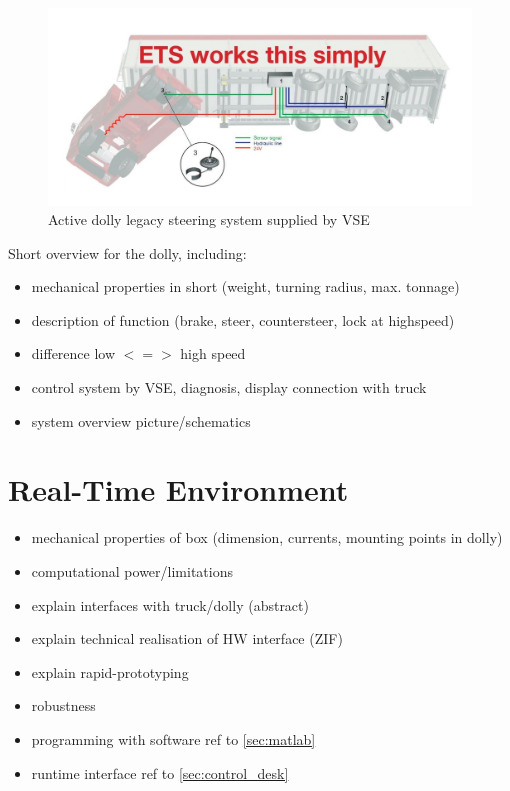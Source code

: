 \documentclass[ExampleMasters.tex]{subfiles}
\begin{document}
\begin{figure}[h]
\centering
\includegraphics[width=1.0\linewidth]{figures/legacy_system_vse}
\caption[]{Active dolly legacy steering system supplied by VSE\cite{dolly_datasheet}}
\label{fig:legacy_system_vse}
\end{figure}





Short overview for the dolly, including: 

\begin{itemize}
\item mechanical properties in short (weight, turning radius, max. tonnage)
\item description of function (brake, steer, countersteer, lock at highspeed)
\item difference low $<=>$ high speed
\item control system by VSE, diagnosis, display connection with truck
\item system overview picture/schematics
\end{itemize}
\section{Real-Time Environment}
\label{sec:realtime_environment}



\begin{itemize}
	\item mechanical properties of box  (dimension, currents, mounting points in dolly)
	\item computational power/limitations
	\item explain interfaces with truck/dolly (abstract)
	\item explain technical realisation of HW interface (ZIF)
	\item explain rapid-prototyping
	\item robustness
	\item programming with software ref to \ref{sec:matlab}
	\item runtime interface ref to \ref{sec:control_desk}
\end{itemize}
\end{document}
